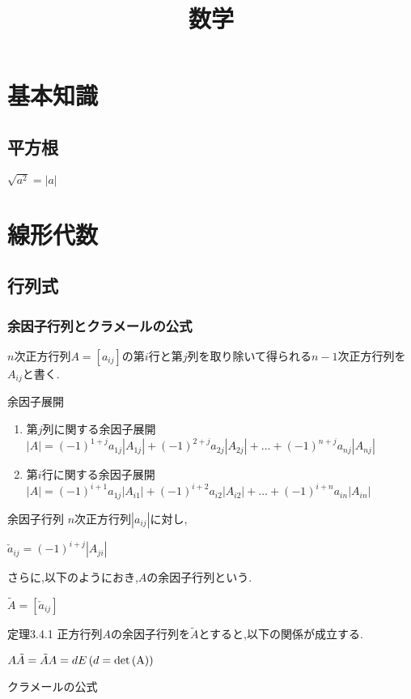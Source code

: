 \documentclass[a4paper]{jsarticle}
\author{}
\title{数学}
\date{}
\begin{document}
\maketitle

\section{基本知識}
\subsection{平方根}
$\sqrt{a^2}=|a|$

\section{線形代数}
\subsection{行列式}
\subsubsection{余因子行列とクラメールの公式}
$n$次正方行列$A=\left[a_{ij}\right]$の第$i$行と第$j$列を取り除いて得られる$n-1$次正方行列を$A_{ij}$と書く.
\begin{itembox}[l]{余因子展開}
    \begin{enumerate}[(1)]
        \item 第$j$列に関する余因子展開\\
              $\left|A\right|=(-1)^{1+j}a_{1j}\left|A_{1j}\right|+(-1)^{2+j}a_{2j}\left|A_{2j}\right|+ \dots +(-1)^{n+j}a_{nj}\left|A_{nj}\right|$
        \item 第$i$行に関する余因子展開\\
              $\left|A\right|=(-1)^{i+1}a_{1j}\left|A_{i1}\right|+(-1)^{i+2}a_{i2}\left|A_{i2}\right|+ \dots +(-1)^{i+n}a_{in}\left|A_{in}\right|$
    \end{enumerate}
\end{itembox}
\begin{itembox}[l]{余因子行列}
    $n$次正方行列$\left|a_{ij}\right|$に対し,
    \begin{center}
        $\check{a}_{ij}=\left(-1\right)^{i+j}\left|A_{ji}\right|$
    \end{center}
    さらに,以下のようにおき,$A$の余因子行列という.
    \begin{center}
        $\tilde{A}=\left[\check{a}_{ij}\right]$
    \end{center}
\end{itembox}
\begin{itembox}[l]{定理3.4.1}
    正方行列$A$の余因子行列を$\tilde{A}$とすると,以下の関係が成立する.
    \begin{center}
        $A\tilde{A}=\tilde{A}A=dE\left (d=\rm{det}\left(A\right)\right)$
    \end{center}
\end{itembox}
\begin{itembox}[l]{クラメールの公式}
\end{itembox}
\end{document}
